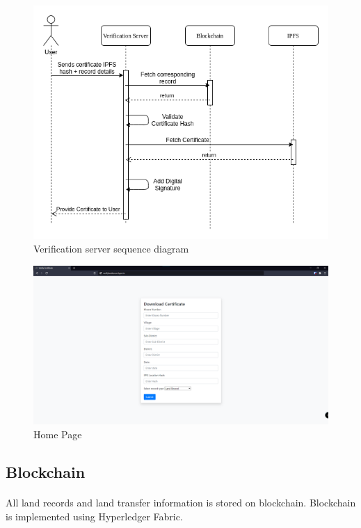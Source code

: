 \documentclass{article}
\begin{document}
        \begin{figure}[H]
                \includegraphics[scale=0.5]{verification_seq.png}
                \centering
                \caption{Verification server sequence diagram}
        \end{figure}
        
        \begin{figure}[H]
                \includegraphics[scale=0.25]{verification_home.png}
                \centering
                \caption{Home Page}
        \end{figure}

    \subsection{Blockchain}
        \paragraph{}
        All land records and land transfer information is stored on blockchain. Blockchain is implemented using Hyperledger Fabric.
\end{document}
